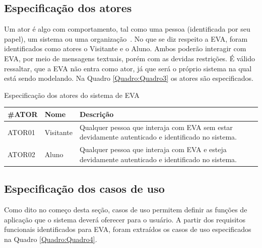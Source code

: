 \subsection{Especificação dos atores}

Um ator é algo com comportamento, tal como uma pessoa (identificada por seu papel), um sistema ou uma organização~\cite{CraigLarman}. 
No que se diz respeito a EVA, foram identificados como atores o Visitante e o Aluno. 
Ambos poderão interagir com EVA, por meio de mensagens textuais, porém com as devidas restrições. 
É válido ressaltar, que a EVA não entra como ator, já que será o próprio sistema na qual está sendo modelando. 
Na Quadro \ref{Quadro:Quadro3} os atores são especificados.

\begin{quadro}[htb!]
\caption{Especificação dos atores do sistema de EVA}
\label{Quadro:Quadro3}
\begin{tabular}{|p{2cm}|p{3cm}|p{7.5cm}|}
  \hline
   \textbf{\#ATOR} & \textbf{Nome}  & \textbf{Descrição}  \\
   \hline
    ATOR01 & Visitante & Qualquer pessoa que interaja com EVA sem estar devidamente autenticado e identificado no sistema. \\
   \hline
    ATOR02 & Aluno & Qualquer pessoa que interaja com EVA e esteja devidamente autenticado e identificado no sistema. \\
   \hline
\end{tabular}
\mfonte
\end{quadro}

\subsection{Especificação dos casos de uso}

Como dito no começo desta seção, casos de uso permitem definir as funções de aplicação que o sistema deverá oferecer para o usuário. A partir dos requisitos funcionais identificados para EVA, foram extraídos os casos de uso especificados na Quadro \ref{Quadro:Quadro4}.

